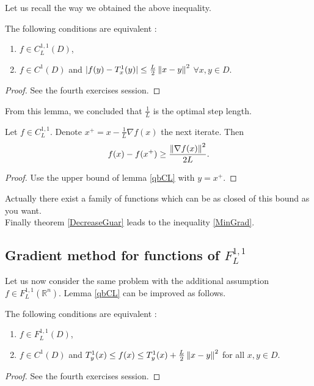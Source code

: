 Let us recall the way we obtained the above inequality.

\begin{lemma}
The following conditions are equivalent :
\begin{enumerate}%
\item $f \in C_L^{1,1}(D)$,
\item $f \in C^1(D)$ and $|f(y) - T_x^1(y)| \le \frac{L}{2}\left\Vert x-y \right\Vert^2$ $\forall x,y \in D$.
\end{enumerate}
\label{qbCL}
\end{lemma}
\begin{proof}
See the fourth exercises session.
\end{proof}

From this lemma, we concluded that $\frac{1}{L}$ is the optimal step length.

\begin{theorem}
Let $f \in C_L^{1,1}$. Denote $x^+ = x - \frac{1}{L}\nabla f(x)$ the next iterate. Then
\begin{equation*}
f(x) - f(x^+) \ge \frac{{\left\Vert \nabla f(x) \right\Vert}^2}{2L}.
\end{equation*}
\label{DecreaseGuar}
\end{theorem}
\begin{proof}
Use the upper bound of lemma \ref{qbCL} with $y = x^+$.
\end{proof}
\noindent Actually there exist a family of functions which can be as closed of this bound as you want. \\

Finally theorem \ref{DecreaseGuar} leads to the inequality \eqref{MinGrad}.

\subsection{Gradient method for functions of $F_L^{1,1}$}

Let us now consider the same problem with the additional assumption $f \in F_L^{1,1}(\mathbb{R}^n)$. Lemma \ref{qbCL} can be improved as follows.

\begin{lemma}
The following conditions are equivalent :
\begin{enumerate}%
\item $f \in F_L^{1,1}(D)$,
\item $f \in C^1(D)$ and $T_y^1(x) \le f(x) \le  T_y^1(x) + \frac{L}{2}\left\Vert x-y \right\Vert^2$ for all $x,y \in D$.
\end{enumerate}
\label{qbFL}
\end{lemma}
\begin{proof}
See the fourth exercises session.
\end{proof}

